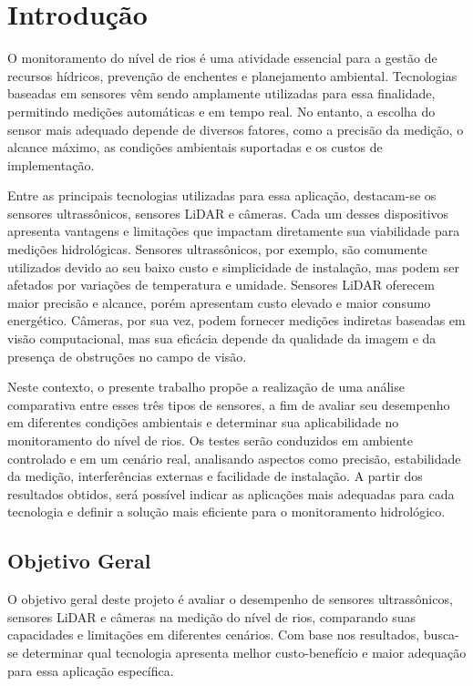 \chapter{Introdução} \label{cap:intro}

O monitoramento do nível de rios é uma atividade essencial para a gestão de recursos hídricos, prevenção de enchentes e planejamento ambiental. Tecnologias baseadas em sensores vêm sendo amplamente utilizadas para essa finalidade, permitindo medições automáticas e em tempo real. No entanto, a escolha do sensor mais adequado depende de diversos fatores, como a precisão da medição, o alcance máximo, as condições ambientais suportadas e os custos de implementação.

Entre as principais tecnologias utilizadas para essa aplicação, destacam-se os sensores ultrassônicos, sensores LiDAR e câmeras. Cada um desses dispositivos apresenta vantagens e limitações que impactam diretamente sua viabilidade para medições hidrológicas. Sensores ultrassônicos, por exemplo, são comumente utilizados devido ao seu baixo custo e simplicidade de instalação, mas podem ser afetados por variações de temperatura e umidade. Sensores LiDAR oferecem maior precisão e alcance, porém apresentam custo elevado e maior consumo energético. Câmeras, por sua vez, podem fornecer medições indiretas baseadas em visão computacional, mas sua eficácia depende da qualidade da imagem e da presença de obstruções no campo de visão.

Neste contexto, o presente trabalho propõe a realização de uma análise comparativa entre esses três tipos de sensores, a fim de avaliar seu desempenho em diferentes condições ambientais e determinar sua aplicabilidade no monitoramento do nível de rios. Os testes serão conduzidos em ambiente controlado e em um cenário real, analisando aspectos como precisão, estabilidade da medição, interferências externas e facilidade de instalação. A partir dos resultados obtidos, será possível indicar as aplicações mais adequadas para cada tecnologia e definir a solução mais eficiente para o monitoramento hidrológico.

\section{Objetivo Geral}

O objetivo geral deste projeto é avaliar o desempenho de sensores ultrassônicos, sensores LiDAR e câmeras na medição do nível de rios, comparando suas capacidades e limitações em diferentes cenários. Com base nos resultados, busca-se determinar qual tecnologia apresenta melhor custo-benefício e maior adequação para essa aplicação específica.

